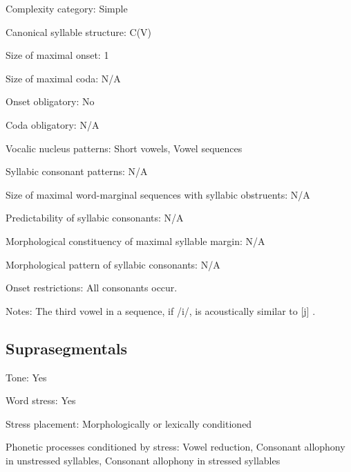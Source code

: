 {\begin{appendixdesc}
\item[Complexity category:] Simple

\item[Canonical syllable structure:] C(V) \citep[163--167]{Chacon2012}

\item[Size of maximal onset:] 1

\item[Size of maximal coda:] N/A

\item[Onset obligatory:] No

\item[Coda obligatory:] N/A

\item[Vocalic nucleus patterns:] Short vowels, Vowel sequences

\item[Syllabic consonant patterns:] N/A

\item[Size of maximal word-marginal sequences with syllabic obstruents:] N/A

\item[Predictability of syllabic consonants:] N/A

\item[Morphological constituency of maximal syllable margin:] N/A

\item[Morphological pattern of syllabic consonants:] N/A

\item[Onset restrictions:] All consonants occur.

\item[Notes:] The third vowel in a sequence, if /i/, is acoustically similar to [j] \citep[52]{Chacon2012}.
\end{appendixdesc}
\subsection*{Suprasegmentals}
\begin{appendixdesc}
\item[Tone:] Yes

\item[Word stress:] Yes

\item[Stress placement:] Morphologically or lexically conditioned

\item[Phonetic processes conditioned by stress:] Vowel reduction, Consonant allophony in unstressed syllables, Consonant allophony in stressed syllables


\end{appendixdesc}}
